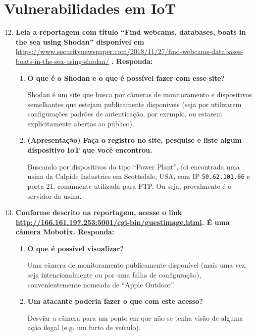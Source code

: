 \documentclass{article}
\newcommand{\code}[1]{\texttt{#1}}
\begin{document}
    \section{Vulnerabilidades em IoT}

    \begin{enumerate}
        \setcounter{enumi}{11}
        \item \textbf{Leia a reportagem com título ``Find webcams, databases,
                boats in the sea using Shodan'' disponível em}
                \url{https://www.securitynewspaper.com/2018/11/27/find-webcams-databases-boats-in-the-sea-using-shodan/}
                \textbf{.
                Responda:}

            \begin{enumerate}
                \item \textbf{O que é o Shodan e o que é possível fazer com esse site?}

                    Shodan é um site que busca por câmeras de monitoramento e
                    dispositivos semelhantes que estejam publicamente
                    disponíveis (seja por utilizarem configurações padrões de
                    autenticação, por exemplo, ou estarem explicitamente
                    abertas ao público).

                \item \textbf{(Apresentação) Faça o registro no site, pesquise
                    e liste algum dispositivo IoT que você encontrou.}

                    Buscando por dispositivos do tipo ``Power Plant'', foi
                    encontrada uma usina da Calpide Industries em Scottsdale,
                    USA, com IP \code{50.62.101.66} e porta 21, comumente
                    utilizada para FTP. Ou seja, provalmente é o servidor da
                    usina.
            \end{enumerate}

        \item \textbf{Conforme descrito na reportagem, acesse o link
            \url{http://166.161.197.253:5001/cgi-bin/guestimage.html}. É uma
            câmera Mobotix. Responda:}

            \begin{enumerate}
                \item \textbf{O que é possível visualizar?}

                    Uma câmera de monitoramento publicamente disponível (mais
                    uma vez, seja intencionalmente ou por uma falha de
                    configuração), convenientemente nomeada de ``Apple
                    Outdoor''.

                \item \textbf{Um atacante poderia fazer o que com este acesso?}

                    Desviar a câmera para um ponto em que não se tenha visão de
                    alguma ação ilegal (e.g. um furto de veículo).
            \end{enumerate}
    \end{enumerate}
\end{document}
